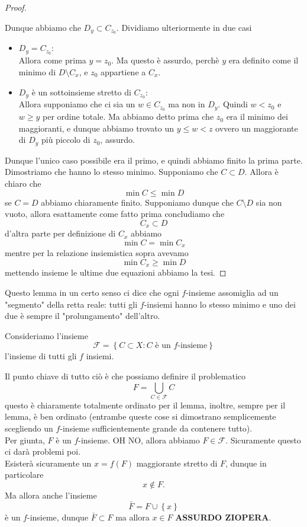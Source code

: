 \documentclass[11pt]{scrartcl}
\begin{document}
\begin{proof}
\begin{itemize}
\begin{itemize}
  			Dunque abbiamo che $D_y \subset C_{z_0}$. Dividiamo ulteriormente in due casi 
  			\begin{itemize}
  				\item $D_y=C_{z_0}$: \\
  				Allora come prima $y=z_0$. Ma questo è assurdo, perchè $y$ era definito come il minimo di $D\setminus C_x$, e $z_0$ appartiene a $C_x$.
  				\item $D_y$ è un sottoinsieme stretto di $C_{z_0}$:\\
  				Allora supponiamo che ci sia un $w\in C_{z_0}$ ma non in $D_y$. Quindi $w<z_0$ e $w\ge y$ per ordine totale. Ma abbiamo detto prima che $z_0$ era il minimo dei maggioranti, e dunque abbiamo trovato un $y\le w < z$ ovvero un maggiorante di $D_y$ più piccolo di $z_0$, assurdo. 
  			\end{itemize}
  		\end{itemize}
  	\end{itemize}
  	Dunque l'unico caso possibile era il primo, e quindi abbiamo finito la prima parte. Dimostriamo che hanno lo stesso minimo. Supponiamo che $C\subset D$. Allora è chiaro che
  	$$\min C \le \min D$$
  	se $C=D$ abbiamo chiaramente finito. Supponiamo dunque che $C\setminus D$ sia non vuoto, allora esattamente come fatto prima concludiamo che
  	$$C_x\subset D$$
  	d'altra parte per definizione di $C_x$ abbiamo 
  	$$\min C = \min C_x$$
  	mentre per la relazione insiemistica sopra avevamo 
  	$$\min C_x \ge \min D $$
  	mettendo insieme le ultime due equazioni abbiamo la tesi.
  \end{proof}
  Questo lemma in un certo senso ci dice che ogni $f$-insieme assomiglia ad un "segmento" della retta reale: tutti gli $f$-insiemi hanno lo stesso minimo e uno dei due è sempre il "prolungamento" dell'altro. \\
  \begin{definition}
  	Consideriamo l'insieme
  	$$\mathcal{F}=\left\{C\subset X:C \text{ è un $f$-insieme}\right\}$$
  	l'insieme di tutti gli $f$ insiemi.
  \end{definition}
  Il punto chiave di tutto ciò è che possiamo definire il problematico
  $$F=\bigcup_{C\in \mathcal{F}}C$$
  questo è chiaramente totalmente ordinato per il lemma, inoltre, sempre per il lemma, è ben ordinato (entrambe queste cose si dimostrano semplicemente scegliendo un $f$-insieme sufficientemente grande da contenere tutto). \\
  Per giunta, $F$ è un $f$-insieme. OH NO, allora abbiamo $F\in \mathcal{F}$. Sicuramente questo ci darà problemi poi. \\
  Esisterà sicuramente un $x=f(F)$ maggiorante stretto di $F$, dunque in particolare 
  $$x\not\in F.$$
  Ma allora anche l'insieme 
  $$\bar{F}=F\cup\left\{x\right\}$$
  è un $f$-insieme, dunque $\bar{F}\subset F$ ma allora $x\in F$ \textbf{ASSURDO ZIOPERA}. 
  
\end{document}
